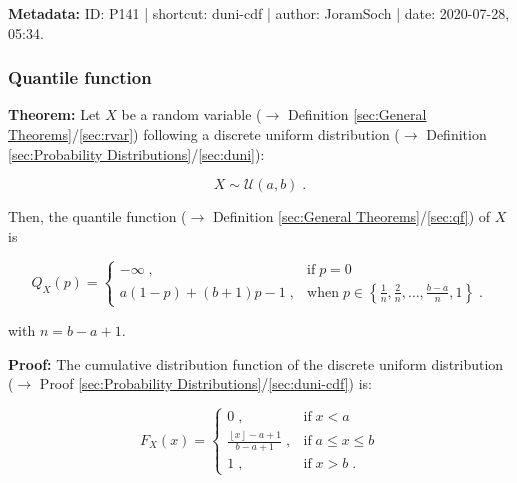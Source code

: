 \documentclass[a4paper,12pt,twoside]{book}
\begin{document}
\vspace{1em}
\textbf{Metadata:} ID: P141 | shortcut: duni-cdf | author: JoramSoch | date: 2020-07-28, 05:34.
\vspace{1em}



\subsubsection[\textbf{Quantile function}]{Quantile function} \label{sec:duni-qf}
\setcounter{equation}{0}

\textbf{Theorem:} Let $X$ be a random variable ($\rightarrow$ Definition \ref{sec:General Theorems}/\ref{sec:rvar}) following a discrete uniform distribution ($\rightarrow$ Definition \ref{sec:Probability Distributions}/\ref{sec:duni}):

\begin{equation} \label{eq:duni-qf-duni}
X \sim \mathcal{U}(a, b) \; .
\end{equation}

Then, the quantile function ($\rightarrow$ Definition \ref{sec:General Theorems}/\ref{sec:qf}) of $X$ is

\begin{equation} \label{eq:duni-qf-duni-qf}
Q_X(p) = \left\{
\begin{array}{rl}
-\infty \; , & \text{if} \; p = 0 \\
a (1-p) + (b+1) p - 1 \; , & \text{when} \; p \in \left\lbrace \frac{1}{n}, \frac{2}{n}, \ldots, \frac{b-a}{n}, 1 \right\rbrace \; .
\end{array}
\right.
\end{equation}

with $n = b - a + 1$.


\vspace{1em}
\textbf{Proof:} The cumulative distribution function of the discrete uniform distribution ($\rightarrow$ Proof \ref{sec:Probability Distributions}/\ref{sec:duni-cdf}) is:

\begin{equation} \label{eq:duni-qf-duni-cdf}
F_X(x) = \left\{
\begin{array}{rl}
0 \; , & \text{if} \; x < a \\
\frac{\left\lfloor{x}\right\rfloor - a + 1}{b - a + 1} \; , & \text{if} \; a \leq x \leq b \\
1 \; , & \text{if} \; x > b \; .
\end{array}
\right.
\end{equation}
\end{document}

